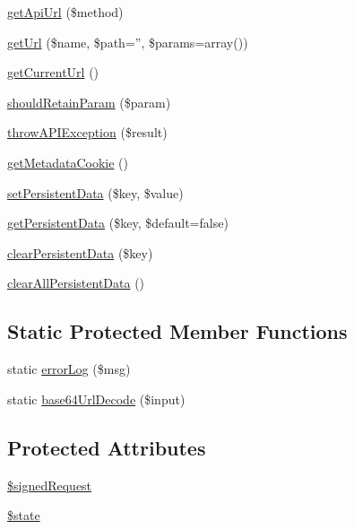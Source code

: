 \begin{DoxyCompactItemize}
\hyperlink{class_base_facebook_a3a844e7cce1bad59e59b7ebdb93baa8a}{get\-Api\-Url} (\$method)
\item 
\hyperlink{class_base_facebook_a40ca413355e37b68c3649839769bda2b}{get\-Url} (\$name, \$path='', \$params=array())
\item 
\hyperlink{class_base_facebook_a5746a277eddefc701ad5308285252465}{get\-Current\-Url} ()
\item 
\hyperlink{class_base_facebook_a47e7827a14b19657e2a760afa5324dad}{should\-Retain\-Param} (\$param)
\item 
\hyperlink{class_base_facebook_a83875df5a95a05bbbb4857460e743404}{throw\-A\-P\-I\-Exception} (\$result)
\item 
\hyperlink{class_base_facebook_a934183edea46236610bc661c92747c71}{get\-Metadata\-Cookie} ()
\item 
\hyperlink{class_base_facebook_a26198ff065bea23f358854facbafa7db}{set\-Persistent\-Data} (\$key, \$value)
\item 
\hyperlink{class_base_facebook_ad383ccec6f7433c2ab9bb50550df2ce6}{get\-Persistent\-Data} (\$key, \$default=false)
\item 
\hyperlink{class_base_facebook_a3bfb6ef7b1abbd3ec0545be109d32bef}{clear\-Persistent\-Data} (\$key)
\item 
\hyperlink{class_base_facebook_a2f98dbe9b9b63d3e76ba7f1971d80c91}{clear\-All\-Persistent\-Data} ()
\end{DoxyCompactItemize}
\subsection*{Static Protected Member Functions}
\begin{DoxyCompactItemize}
\item 
static \hyperlink{class_base_facebook_a8f2b4289828f4f1e758c05f483eca682}{error\-Log} (\$msg)
\item 
static \hyperlink{class_base_facebook_a8cb499f186fbbd10b7d30c37094d9b97}{base64\-Url\-Decode} (\$input)
\end{DoxyCompactItemize}
\subsection*{Protected Attributes}
\begin{DoxyCompactItemize}
\item 
\hyperlink{class_base_facebook_a90c6ec44757d540ffe1539f512af7469}{\$signed\-Request}
\item 
\hyperlink{class_base_facebook_a8c3903cc0e9a12c87dfae721648491a2}{\$state}
\end{DoxyCompactItemize}

